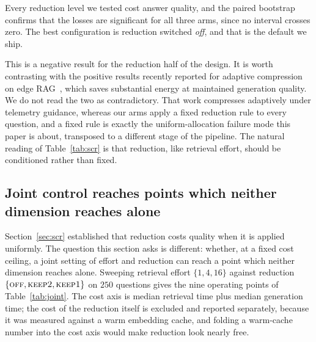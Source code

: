 \documentclass[journal]{IEEEtran}
\begin{document}
Every reduction level we tested cost answer quality, and the paired
bootstrap confirms that the losses are significant for all three arms,
since no interval crosses zero. The best configuration is reduction
switched \emph{off}, and that is the default we ship.

This is a negative result for the reduction half of the design. It is worth
contrasting with the positive results recently reported for adaptive
compression on edge RAG~\cite{feric2026adaptivecompression}, which saves
substantial energy at maintained generation quality. We do not read the two
as contradictory. That work compresses adaptively under telemetry guidance,
whereas our arms apply a fixed reduction rule to every question, and a
fixed rule is exactly the uniform-allocation failure mode this paper is
about, transposed to a different stage of the pipeline. The natural reading
of Table~\ref{tab:scr} is that reduction, like retrieval effort, should be
conditioned rather than fixed.

\subsection{Joint control reaches points which neither dimension reaches alone}
\label{sec:joint}

Section~\ref{sec:scr} established that reduction costs quality when it is
applied uniformly. The question this section asks is different: whether, at
a fixed cost ceiling, a joint setting of effort and reduction can reach a
point which neither dimension reaches alone. Sweeping retrieval effort
$\{1,4,16\}$ against reduction
$\{\textsc{off},\textsc{keep2},\textsc{keep1}\}$ on $250$ questions gives
the nine operating points of Table~\ref{tab:joint}. The cost axis is median
retrieval time plus median generation time; the cost of the reduction
itself is excluded and reported separately, because it was measured against
a warm embedding cache, and folding a warm-cache number into the cost axis
would make reduction look nearly free.
\end{document}
